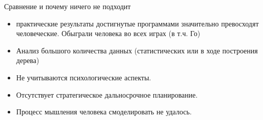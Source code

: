 \begin{frame}{Сравнение и почему ничего не подходит}
\begin{itemize}
\item  практические результаты достигнутые программами значительно превосходят человеческие. Обыграли человека во всех играх (в т.ч. Го)
\item Анализ большого количества данных (статистических или в ходе построения дерева)
\item Не учитываются психологические аспекты.
\item Отсутствует стратегическое дальносрочное планирование.
\item Процесс мышления человека смоделировать не удалось.
\end{itemize}
\end{frame} 
